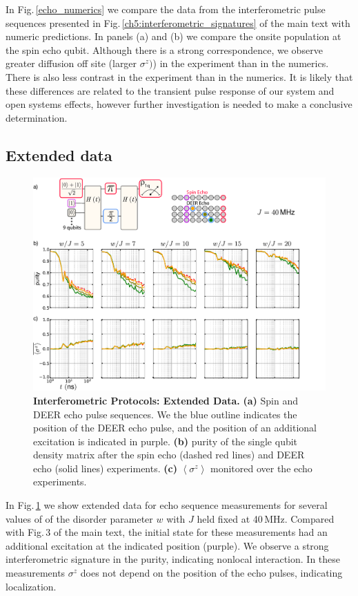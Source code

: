 In Fig.\,\ref{echo_numerics} we compare the data from the interferometric pulse sequences presented in Fig.\,\ref{ch5:interferometric_signatures} of the main text with numeric predictions.  In panels (a) and (b) we compare the onsite population at the spin echo qubit.  Although there is a strong correspondence, we observe greater diffusion off site (larger $\sigma^z)$)  in the experiment than in the numerics.  There is also less contrast in the experiment than in the numerics.  It is likely that these differences are related to the transient pulse response of our system and open systems effects, however further investigation is needed to make a conclusive determination.

\subsection{Extended data}
\begin{figure}
\centering
\includegraphics[width=140mm, keepaspectratio]{./PDF/fs9_190919_513p.pdf}%
\caption{\textbf{Interferometric Protocols:  Extended Data.}
\textbf{(a)} Spin and DEER echo pulse sequences.  We the blue outline indicates the position of the DEER echo pulse, and the position of an additional excitation is indicated in purple.
\textbf{(b)} purity of the single qubit density matrix after the spin echo (dashed red lines) and DEER echo (solid lines) experiments.
\textbf{(c)} $\left< \sigma^z \right>$ monitored over the echo experiments.
}
\label{echo_extended_data}
\end{figure}

In Fig.\,\ref{echo_extended_data} we show extended data for echo sequence measurements for several values of of the disorder parameter $w$ with $J$ held fixed at 40\,MHz.  Compared with Fig.\,3 of the main text, the initial state for these measurements had an additional excitation at the indicated position (purple).  We observe a strong interferometric signature in the purity, indicating nonlocal interaction.  In these measurements $\sigma^z$ does not depend on the position of the echo pulses, indicating localization.

